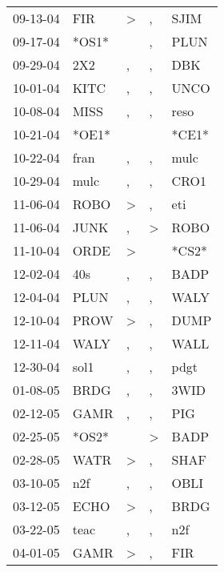 \begin{supertabular}{lllll}
 09-13-04 &    FIR &     \textgreater &                , &   SJIM \\
 09-17-04 &  *OS1* &                  &                , &   PLUN \\
 09-29-04 &    2X2 &                , &                , &    DBK \\
 10-01-04 &   KITC &                , &                , &   UNCO \\
 10-08-04 &   MISS &                , &                , &   reso \\
 10-21-04 &  *OE1* &                  &                  &  *CE1* \\
 10-22-04 &   fran &                , &                , &   mulc \\
 10-29-04 &   mulc &                , &                , &   CRO1 \\
 11-06-04 &   ROBO &     \textgreater &                , &    eti \\
 11-06-04 &   JUNK &                , &     \textgreater &   ROBO \\
 11-10-04 &   ORDE &     \textgreater &                  &  *CS2* \\
 12-02-04 &    40s &                , &                , &   BADP \\
 12-04-04 &   PLUN &                , &                , &   WALY \\
 12-10-04 &   PROW &     \textgreater &                , &   DUMP \\
 12-11-04 &   WALY &                , &                , &   WALL \\
 12-30-04 &   sol1 &                , &                , &   pdgt \\
 01-08-05 &   BRDG &                , &                , &   3WID \\
 02-12-05 &   GAMR &                , &                , &    PIG \\
 02-25-05 &  *OS2* &                  &     \textgreater &   BADP \\
 02-28-05 &   WATR &     \textgreater &                , &   SHAF \\
 03-10-05 &    n2f &                , &                , &   OBLI \\
 03-12-05 &   ECHO &     \textgreater &                , &   BRDG \\
 03-22-05 &   teac &                , &                , &    n2f \\
 04-01-05 &   GAMR &     \textgreater &                , &    FIR \\

\end{supertabular}
